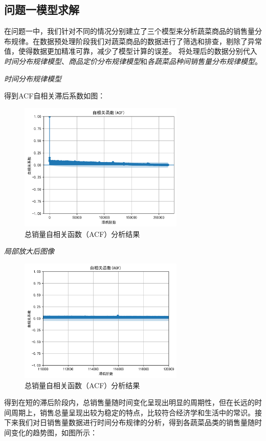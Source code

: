 \documentclass{article}
\begin{document}
\subsection{问题一模型求解}
在问题一中，我们针对不同的情况分别建立了三个模型来分析蔬菜商品的销售量分布规律。在数据预处理阶段我们对蔬菜商品的数据进行了筛选和排查，剔除了异常值，使得数据更加精准可靠，减少了模型计算的误差。
将处理后的数据分别代入\textit{时间分布规律模型}、\textit{商品定价分布规律模型}和\textit{各蔬菜品种间销售量分布规律模型}。

\textit{时间分布规律模型}

得到ACF自相关滞后系数如图：
\begin{figure}[H]
    \centering
    \includegraphics[width=0.7\textwidth]{calc_ACF/ACF_plot.png}
    \caption{总销量自相关函数（ACF）分析结果}
    \label{fig:acf}
\end{figure}
\textit{局部放大后图像}
\begin{figure}[H]
    \centering
    \includegraphics[width=0.7\textwidth]{calc_ACF/ACF_plot_zoomed.png}
    \caption{总销量自相关函数（ACF）分析结果}
    \label{fig:acf}
\end{figure}
得到在短的滞后阶段内，总销售量随时间变化呈现出明显的周期性，但在长远的时间周期上，销售总量呈现出较为稳定的特点，比较符合经济学和生活中的常识。接下来我们对日销售量数据进行时间分布规律的分析，得到各蔬菜品类的销售量随时间变化的趋势图，如图所示：
\end{document}
